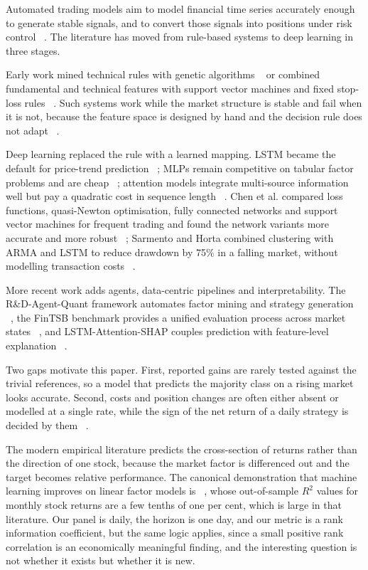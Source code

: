 \documentclass[pdflatex,sn-mathphys-ay]{sn-jnl}
\theoremstyle{thmstyleone}%
\theoremstyle{thmstyletwo}%
\theoremstyle{thmstyletwo}%
\begin{document}
Automated trading models aim to model financial time series accurately enough to generate stable
signals, and to convert those signals into positions under risk control ~\citep{chen2025analysis,
	sarmento2019enhancing}. The literature has moved from rule-based systems to deep learning in three
stages.

Early work mined technical rules with genetic algorithms ~\citep{allen1999using} or combined
fundamental and technical features with support vector machines and fixed stop-loss rules
~\citep{mani2016stock,SVM}. Such systems work while the market structure is stable and fail when it
is not, because the feature space is designed by hand and the decision rule does not adapt
~\citep{li2025rd}.

Deep learning replaced the rule with a learned mapping. LSTM became the default for price-trend
prediction ~\citep{ahmed2026explainable,akgun2024stock}; MLPs remain competitive on tabular
factor problems and are cheap ~\citep{MLP,zhao2026cryptomamba}; attention models integrate
multi-source information well but pay a quadratic cost in sequence length
~\citep{vaswani2017attention,kadiyala2025mamba}. Chen et al. compared loss functions, quasi-Newton
optimisation, fully connected networks and support vector machines for frequent trading and found
the network variants more accurate and more robust ~\citep{chen2025analysis}; Sarmento and Horta
combined clustering with ARMA and LSTM to reduce drawdown by 75\% in a falling market, without
modelling transaction costs ~\citep{sarmento2019enhancing}.

More recent work adds agents, data-centric pipelines and interpretability. The R\&D-Agent-Quant
framework automates factor mining and strategy generation ~\citep{li2025rd}, the FinTSB benchmark
provides a unified evaluation process across market states ~\citep{hu2025fintsb}, and
LSTM-Attention-SHAP couples prediction with feature-level explanation ~\citep{ahmed2026explainable}.

Two gaps motivate this paper. First, reported gains are rarely tested against the trivial
references, so a model that predicts the majority class on a rising market looks accurate. Second,
costs and position changes are often either absent or modelled at a single rate, while the sign of
the net return of a daily strategy is decided by them ~\citep{frazzini2018trading}.

The modern empirical literature predicts the cross-section of returns rather than the direction of one
stock, because the market factor is differenced out and the target becomes relative performance. The
canonical demonstration that machine learning improves on linear factor models is
~\citet{gu2020empirical}, whose out-of-sample $R^2$ values for monthly stock returns are a few tenths
of one per cent, which is large in that literature. Our panel is daily, the horizon is one day, and
our metric is a rank information coefficient, but the same logic applies, since a small positive rank
correlation is an economically meaningful finding, and the interesting question is not whether it
exists but whether it is new.
\end{document}
